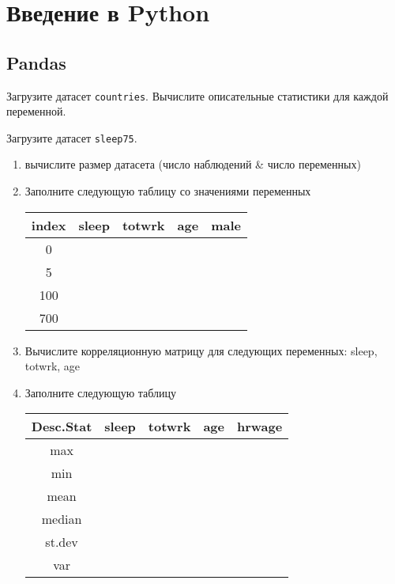 
\section{Введение в Python}

\subsection{Pandas}

\begin{exercise}
Загрузите датасет \texttt{countries}. Вычислите описательные статистики 
для каждой переменной.
\end{exercise}

\begin{exercise}
Загрузите датасет \texttt{sleep75}.
\begin{enumerate}
	\item вычислите размер датасета (число наблюдений \& число переменных)
	\item Заполните следующую таблицу со значениями переменных
	\begin{center}
		\begin{tabular}{|c|c|c|c|c|} \hline
			index & sleep & totwrk & age & male\\ \hline\hline
			0 & & & & \\ \hline
			5 & & & & \\ \hline
			100 & & & & \\ \hline
			700 & & & & \\ \hline
		\end{tabular}
	\end{center}
	\item Вычислите корреляционную матрицу для следующих переменных: sleep, totwrk, age 
	\item Заполните следующую таблицу
	\begin{center}
		\begin{tabular}{|c|c|c|c|c|} \hline
			Desc.Stat & sleep & totwrk & age & hrwage\\ \hline\hline
			max & & & & \\ \hline
			min & & & & \\ \hline
			mean & & & & \\ \hline
			median & & & & \\ \hline
			st.dev & & & & \\ \hline
			var & & & & \\ \hline

\end{tabular}
\end{center}
\end{enumerate}
\end{exercise}
